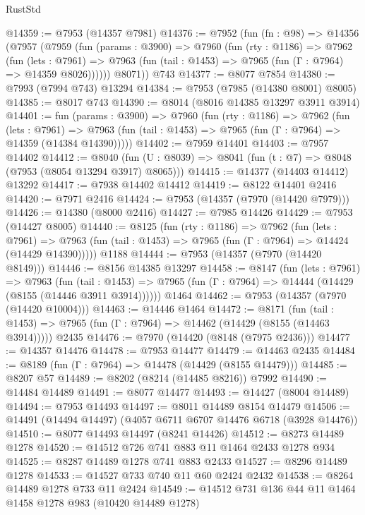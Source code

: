\begin{lexlean}{RustStd}
\begin{coremodule}
@14359 := @7953 (@14357 @7981)
@14376 := @7952
    (fun (fn : @98) =>
    @14356
      (@7957
        (@7959
          (fun (params : @3900) =>
          @7960
            (fun (rty : @1186) =>
            @7962
              (fun (lets : @7961) =>
              @7963 (fun (tail : @1453) => @7965 (fun (Γ : @7964) => @14359 @8026))))))
        @8071))
    @743
@14377 := @8077 @7854
@14380 := @7993 (@7994 @743) @13294
@14384 := @7953 (@7985 (@14380 @8001) @8005)
@14385 := @8017 @743
@14390 := @8014 (@8016 @14385 @13297 @3911 @3914)
@14401 := fun (params : @3900) =>
  @7960
    (fun (rty : @1186) =>
    @7962
      (fun (lets : @7961) =>
      @7963 (fun (tail : @1453) => @7965 (fun (Γ : @7964) => @14359 (@14384 @14390)))))
@14402 := @7959 @14401
@14403 := @7957 @14402
@14412 := @8040
    (fun (U : @8039) => @8041 (fun (t : @7) => @8048 (@7953 (@8054 @13294 @3917) @8065)))
@14415 := @14377 (@14403 @14412) @13292
@14417 := @7938 @14402 @14412
@14419 := @8122 @14401 @2416
@14420 := @7971 @2416
@14424 := @7953 (@14357 (@7970 (@14420 @7979)))
@14426 := @14380 (@8000 @2416)
@14427 := @7985 @14426
@14429 := @7953 (@14427 @8005)
@14440 := @8125
    (fun (rty : @1186) =>
    @7962
      (fun (lets : @7961) =>
      @7963 (fun (tail : @1453) => @7965 (fun (Γ : @7964) => @14424 (@14429 @14390)))))
    @1188
@14444 := @7953 (@14357 (@7970 (@14420 @8149)))
@14446 := @8156 @14385 @13297
@14458 := @8147
    (fun (lets : @7961) =>
    @7963
      (fun (tail : @1453) =>
      @7965 (fun (Γ : @7964) => @14444 (@14429 (@8155 (@14446 @3911 @3914))))))
    @1464
@14462 := @7953 (@14357 (@7970 (@14420 @10004)))
@14463 := @14446 @1464
@14472 := @8171
    (fun (tail : @1453) => @7965 (fun (Γ : @7964) => @14462 (@14429 (@8155 (@14463 @3914)))))
    @2435
@14476 := @7970 (@14420 (@8148 (@7975 @2436)))
@14477 := @14357 @14476
@14478 := @7953 @14477
@14479 := @14463 @2435
@14484 := @8189 (fun (Γ : @7964) => @14478 (@14429 (@8155 @14479)))
@14485 := @8207 @57
@14489 := @8202 (@8214 (@14485 @8216)) @7992
@14490 := @14484 @14489
@14491 := @8077 @14477
@14493 := @14427 (@8004 @14489)
@14494 := @7953 @14493
@14497 := @8011 @14489 @8154 @14479
@14506 := @14491 (@14494 @14497) (@4057 @6711 @6707 @14476 @6718 (@3928 @14476))
@14510 := @8077 @14493 @14497 (@8241 @14426)
@14512 := @8273 @14489 @1278
@14520 := @14512 @726 @741 @883 @11 @1464 @2433 @1278 @934
@14525 := @8287 @14489 @1278 @741 @883 @2433
@14527 := @8296 @14489 @1278
@14533 := @14527 @733 @740 @11 @60 @2424 @2432
@14538 := @8264 @14489 @1278 @733 @11 @2424
@14549 := @14512 @731 @136 @44 @11 @1464 @1458 @1278 @983 (@10420 @14489 @1278)

\end{coremodule}
\end{lexlean}
